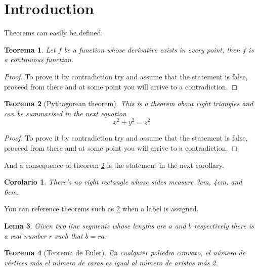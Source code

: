 \documentclass{article}
\theoremstyle{plain}
\newtheorem{theorem}{Teorema}[section]
\newtheorem{corollary}{Corolario}[theorem]
\newtheorem{lemma}[theorem]{Lema}
\begin{document}
\section{Introduction}
Theorems can easily be defined:

\begin{theorem}
Let \(f\) be a function whose derivative exists in every point, then \(f\) is 
a continuous function.
\end{theorem}
\begin{proof}
To prove it by contradiction try and assume that the statement is false,
proceed from there and at some point you will arrive to a contradiction.
\end{proof}

\begin{theorem}[Pythagorean theorem]
\label{pythagorean}
This is a theorem about right triangles and can be summarised in the next 
equation 
\[ x^2 + y^2 = z^2 \]
\end{theorem}
\renewcommand\qedsymbol{$\blacksquare$}

\begin{proof}
To prove it by contradiction try and assume that the statement is false,
proceed from there and at some point you will arrive to a contradiction.
\end{proof}
And a consequence of theorem \ref{pythagorean} is the statement in the next 
corollary.

\begin{corollary}
There's no right rectangle whose sides measure 3cm, 4cm, and 6cm.
\end{corollary}

You can reference theorems such as \ref{pythagorean} when a label is assigned.

\begin{lemma}
Given two line segments whose lengths are \(a\) and \(b\) respectively there is a 
real number \(r\) such that \(b=ra\).
\end{lemma}

\begin{theorem}[Teorema de Euler]
En cualquier poliedro convexo, el número de vértices más el número de caras es igual al número de aristas más 2.
\end{theorem}
\end{document}
